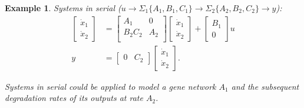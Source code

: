 \documentclass[11 pt]{article}
\newtheorem{example}{Example}
\begin{document}
  \begin{example}
    Systems in serial ($u \rightarrow \Sigma_{1} \{A_{1},B_{1},C_{1} \} \rightarrow \Sigma_{2} \{A_{2},B_{2},C_{2} \} \rightarrow y$):
    \begin{align*}
      \begin{bmatrix} \dot{x}_{1} \\ \dot{x}_{2} \end{bmatrix} &= \left[ \begin{array}{c|c}
        A_{1} & 0 \\
          \hline
          B_{2}C_{2} & A_{2} \\
        \end{array} \right] \begin{bmatrix} \dot{x}_{1} \\ \dot{x}_{2} \end{bmatrix}  + \begin{bmatrix} B_{1} \\ 0 \end{bmatrix} u \\
          y &= \begin{bmatrix} 0 & C_{2} \end{bmatrix} \begin{bmatrix} \dot{x}_{1} \\ \dot{x}_{2} \end{bmatrix} .
    \end{align*}

  Systems in serial could be applied to model a gene network $A_{1}$ and the subsequent degradation rates of its outputs at rate $A_{2}$.
  \end{example}
\end{document}
